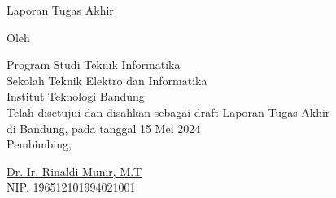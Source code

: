 \clearpage
\pagestyle{empty}

\begin{center}
    \smallskip

    \Large \bfseries \MakeUppercase{\thetitle}
    \vfill

    \Large Laporan Tugas Akhir
    \vfill

    \large Oleh

    \Large \theauthor

    \large Program Studi Teknik Informatika \\

    \normalsize \normalfont
    Sekolah Teknik Elektro dan Informatika \\
    Institut Teknologi Bandung \\

    \vfill
    \normalsize \normalfont
    Telah disetujui dan disahkan sebagai draft Laporan Tugas Akhir \\
    di Bandung, pada tanggal 15 Mei 2024 \\

    \vspace{0.3cm}
    Pembimbing,

    \vspace{2cm}
    \underline{{{Dr. Ir. Rinaldi Munir, M.T}}} \\
    NIP. {{196512101994021001}}

\end{center}
\clearpage
